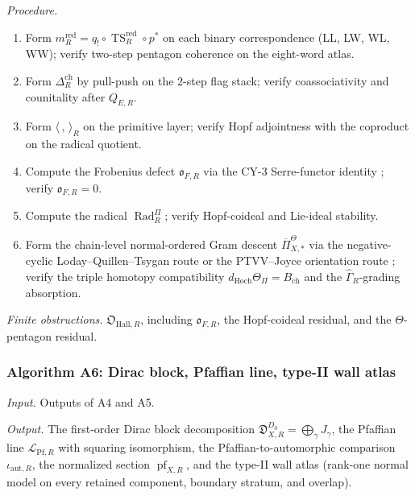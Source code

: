 \textit{Procedure.}
\begin{enumerate}
\item Form $m_R^{\mathrm{red}}=q_!\circ\operatorname{TS}^{\mathrm{red}}_R
\circ p^*$ on each binary correspondence (LL, LW, WL, WW); verify
two-step pentagon coherence on the eight-word atlas.
\item Form $\Delta_R^{\mathrm{ch}}$ by pull-push on the $2$-step flag
stack; verify coassociativity and counitality after $Q_{E,R}$.
\item Form $\langle\,,\,\rangle_R$ on the primitive layer; verify
Hopf adjointness with the coproduct on the radical quotient.
\item Compute the Frobenius defect $\mathfrak o_{F,R}$ via the
CY-3 Serre-functor identity \cite{KSCoHA}; verify
$\mathfrak o_{F,R}=0$.
\item Compute the radical $\operatorname{Rad}_R^\Pi$; verify
Hopf-coideal and Lie-ideal stability.
\item Form the chain-level normal-ordered Gram descent
$\overline\Pi_{X,*}^\Theta$ via the negative-cyclic
Loday--Quillen--Tsygan route or the PTVV--Joyce orientation route
\cite{LodayQuillen1984,Tsygan1983,LodayCyclicHomology,PTVV2013};
verify the triple homotopy compatibility
$d_{\mathrm{Hoch}}\Theta_\Pi=B_{\mathrm{ch}}$ and the
$\widehat\Gamma_R$-grading absorption.
\end{enumerate}

\textit{Finite obstructions.}  $\mathfrak O_{\mathrm{Hall},R}$,
including $\mathfrak o_{F,R}$, the Hopf-coideal residual, and the
$\Theta$-pentagon residual.

\subsubsection*{Algorithm A6: Dirac block, Pfaffian line, type-II
wall atlas}

\textit{Input.} Outputs of A4 and A5.

\textit{Output.} The first-order Dirac block decomposition
$\mathfrak D_{X,R}^{D_0}=\bigoplus_\gamma J_\gamma$, the Pfaffian
line $\mathscr L_{\mathrm{Pf},R}$ with squaring isomorphism, the
Pfaffian-to-automorphic comparison $\iota_{\mathrm{aut},R}$, the
normalized section $\operatorname{pf}_{X,R}$, and the type-II wall
atlas (rank-one normal model on every retained component, boundary
stratum, and overlap).

